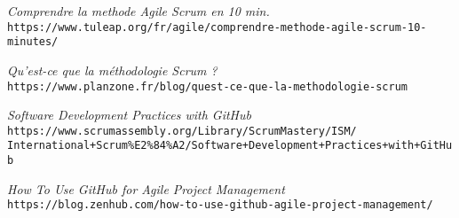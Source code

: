 \documentclass{article}
\begin{document}
\begin{thebibliography}{10}

	\textit{Comprendre la methode Agile Scrum en 10 min.} \\
	\texttt{https://www.tuleap.org/fr/agile/comprendre-methode-agile-scrum-10-minutes/}
	
	\textit{Qu'est-ce que la méthodologie Scrum ?} \\
	\texttt{https://www.planzone.fr/blog/quest-ce-que-la-methodologie-scrum}
	
	\textit{Software Development Practices with GitHub} \\
	\texttt{https://www.scrumassembly.org/Library/ScrumMastery/ISM/\\
	International+Scrum\%E2\%84\%A2/Software+Development+Practices+with+GitHub}
	
	\textit{How To Use GitHub for Agile Project Management} \\
	\texttt{https://blog.zenhub.com/how-to-use-github-agile-project-management/}

\end{thebibliography}
\end{document}
